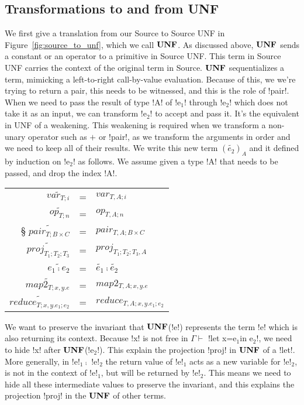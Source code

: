 

\subsection{Transformations to and from UNF} %
\label{sub:transformations to and from UNF}

We first give a translation from our Source to Source UNF in Figure~\ref{fig:source_to_unf}, which we call $\mathbf{UNF}$.
As discussed above, $\mathbf{UNF}$ sends a constant or an operator to a primitive in Source UNF. 
This term in Source UNF carries the context of the original term in Source.
$\mathbf{UNF}$ sequentializes a term, mimicking a left-to-right call-by-value evaluation.
Because of this, we we're trying to return a pair, this needs to be witnessed, and this is the role of !pair!.
When we need to pass the result of type !A! of !e$_{1}$! through !e$_{2}$! which does not take it as an input, we can transform !e$_{2}$! to accept and pass it.
It's the equivalent in UNF of a weakening.
This weakening is required when we transform a non-unary operator such as $+$ or !pair!, as we transform the arguments in order and we need to keep all of their results.
We write this new term $(\widetilde{e_{2}})_{A}$ and it defined by induction on !e$_{2}$! as follows. 
We assume given a type !A! that needs to be passed, and drop the index !A!.

\begin{tabular}{r c l}
    $\widetilde{var_{T;i}}$  &=& $var_{T,A;i}$ \\
    $\widetilde{op_{T;n}}$  &=& $op_{T,A;n}$ \\§
    $\widetilde{pair_{T;B\times C}}$  &=& $pair_{T,A;B\times C}$ \\
    $\widetilde{proj_{T_1;T_2;T_3}}$  &=& $proj_{T_1;T_2;T_3,A}$ \\
    $\widetilde{e_1 \comp e_2}$  &=& $\widetilde{e_1}\comp\widetilde{e_2}$ \\
    $\widetilde{map2_{T;x,y.e}}$  &=& $map2_{T,A;x,y.e}$ \\
    $\widetilde{reduce_{T;x,y.e_1;e_2}}$ &=& $reduce_{T,A;x,y.e_1;e_2}$ \\
\end{tabular}

We want to preserve the invariant that $\mathbf{UNF}$(!e!) represents the term !e! which is also returning its context. 
Because !x! is not free in $\Gamma \vdash$ !let x=e$_1$in e$_2$!, we need to hide !x! after $\mathbf{UNF}$(!e$_2$!).
This explain the projection !proj! in $\mathbf{UNF}$ of a !let!. 
More generally, in !e!$_{1} \comp$ !e!$_{2}$ the return value of !e!$_{1}$ acts as a new variable for !e!$_{2}$, 
is not in the context of !e!$_{1}$, but will be returned by !e!$_{2}$.
This means we need to hide all these intermediate values to preserve the invariant,
and this explains the projection !proj! in the $\mathbf{UNF}$ of other terms. 

